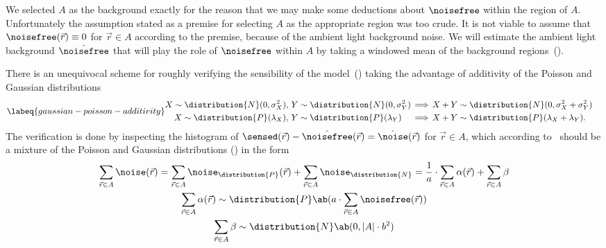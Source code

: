 We selected \(A\) as the background exactly for the reason that we may make some deductions about \(\noisefree\) within
    the region of \(A\).
Unfortunately the assumption stated as a premise for selecting \(A\) as the appropriate region was too crude. 
It is not viable to assume that \(\noisefree(\vec{r}) \equiv 0\) for \(\vec{r} \in A\) according to the premise, because
    of the ambient light background noise.
We will estimate the ambient light background \(\hat{\noisefree}\) that will play the role of \(\noisefree\) within 
    \(A\) by taking a windowed mean of the background regions~().%
\begin{marginfigure}
    \caption{The estimate \(\hat{\noisefree}\) using the windowed mean of the background.}
\end{marginfigure}%
There is an unequivocal scheme for roughly verifying the sensibility of the 
    model~() taking the advantage of additivity of the Poisson and Gaussian 
    distributions
    \begin{align}
        \labeq{gaussian-poisson-additivity}
        \begin{gathered}
            X \sim \distribution{N}(0, \sigma^2_X),\, Y \sim \distribution{N}(0, \sigma^2_Y)\\
            X \sim \distribution{P}(\lambda_X),\,Y \sim \distribution{P}(\lambda_Y)
        \end{gathered}
        &\begin{gathered}
           \,\implies\,\\
           \,\implies\,
        \end{gathered}
        \begin{aligned}
            X + Y &\sim \distribution{N}(0, \sigma^2_X + \sigma^2_Y) \\
            X + Y &\sim \distribution{P}(\lambda_X + \lambda_Y).
        \end{aligned}
    \end{align}
    The verification is done by inspecting the histogram of \(\sensed(\vec{r}) - \hat{\noisefree}(\vec{r})
    = \hat{\noise}(\vec{r})\) for \(\vec{r} \in A\), which according to~ should be a 
    mixture of the Poisson and Gaussian distributions () in the form
    \begin{gather*}
        \sum_{\vec{r} \in A} \noise(\vec{r}) = \sum_{\vec{r} \in A} \noise_{\distribution{P}}(\vec{r})
        + \sum_{\vec{r} \in A} \noise_{\distribution{N}} = \frac{1}{a} \cdot \sum_{\vec{r} \in A}
        \alpha(\vec{r})
    + \sum_{\vec{r} \in A} \beta \\
\sum_{\vec{r} \in A} \alpha(\vec{r}) \sim \distribution{P}\ab(a \cdot \sum_{\vec{r} \in A} \noisefree(\vec{r})) \\
\sum_{\vec{r} \in A} \beta \sim \distribution{N}\ab(0, |A| \cdot b^2) 
    \end{gather*}
